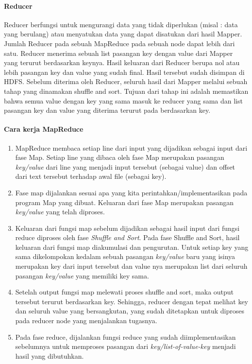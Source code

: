 \paragraph{Reducer}

Reducer berfungsi untuk mengurangi data yang tidak diperlukan (misal : data yang berulang) atau menyatukan data yang dapat disatukan dari hasil Mapper. Jumlah Reducer pada sebuah MapReduce pada sebuah node dapat lebih dari satu. Reducer menerima sebuah list pasangan key dengan value dari Mapper yang terurut berdasarkan keynya. Hasil keluaran dari Reducer berupa nol atau lebih pasangan key dan value yang sudah final. Hasil tersebut sudah disimpan di HDFS. Sebelum diterima oleh Reducer, seluruh hasil dari Mapper melalui sebuah tahap yang dinamakan shuffle and sort. Tujuan dari tahap ini adalah memastikan bahwa semua value dengan key yang sama masuk ke reducer yang sama dan list pasangan key dan value yang diterima terurut pada berdasarkan key.

\paragraph{Cara kerja MapReduce}


\begin{enumerate}
	\item MapReduce membaca setiap line dari input yang dijadikan sebagai input dari fase Map. Setiap line yang dibaca oleh fase Map merupakan pasangan \textit{key/value} dari line yang menjadi input tersebut (sebagai value) dan offset dari text tersebut terhadap awal file (sebagai key).
	\item Fase map dijalankan sesuai apa yang kita perintahkan/implementasikan pada program Map yang dibuat. Keluaran dari fase Map merupakan pasangan \textit{key/value} yang telah diproses.
	\item Keluaran dari fungsi map sebelum dijadikan sebagai hasil input dari fungsi reduce diproses oleh fase \textit{Shuffle and Sort}. Pada fase Shuffle and Sort, hasil keluaran dari fungsi map diakumulasi dan pengurutan. Untuk setiap key yang sama dikelompokan kedalam sebuah pasangan \textit{key/value} baru yang isinya merupakan key dari input tersebut dan value nya merupakan list dari seluruh pasangan \textit{key/value} yang memiliki key sama.
	\item Setelah output fungsi map melewati proses shuffle and sort, maka output tersebut terurut berdasarkan key. Sehingga, reducer dengan tepat melihat key dan seluruh value yang bersangkutan, yang sudah ditetapkan untuk diproses pada reducer node yang menjalankan tugasnya.
	\item Pada fase reduce, dijalankan fungsi reduce yang sudah diimplementasikan sebelumnya untuk memproses pasangan dari \textit{key/list-of-value-key} menjadi hasil yang dibutuhkan.
\end{enumerate}

